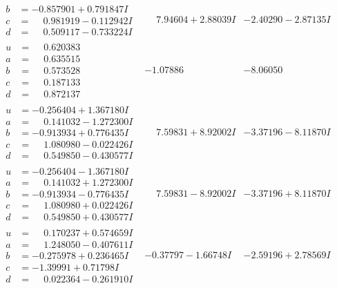 \documentclass[1p]{elsarticle_modified}
\theoremstyle{definition}
\begin{document}
$$\begin{array}{c|c|c}
\begin{aligned}
b &= -0.857901 + 0.791847 I \\
c &= \phantom{-}0.981919 - 0.112942 I \\
d &= \phantom{-}0.509117 - 0.733224 I\end{aligned}
 & \phantom{-}7.94604 + 2.88039 I & -2.40290 - 2.87135 I \\ \hline\begin{aligned}
u &= \phantom{-}0.620383\phantom{ +0.000000I} \\
a &= \phantom{-}0.635515\phantom{ +0.000000I} \\
b &= \phantom{-}0.573528\phantom{ +0.000000I} \\
c &= \phantom{-}0.187133\phantom{ +0.000000I} \\
d &= \phantom{-}0.872137\phantom{ +0.000000I}\end{aligned}
 & -1.07886\phantom{ +0.000000I} & -8.06050\phantom{ +0.000000I} \\ \hline\begin{aligned}
u &= -0.256404 + 1.367180 I \\
a &= \phantom{-}0.141032 - 1.272300 I \\
b &= -0.913934 + 0.776435 I \\
c &= \phantom{-}1.080980 - 0.022426 I \\
d &= \phantom{-}0.549850 - 0.430577 I\end{aligned}
 & \phantom{-}7.59831 + 8.92002 I & -3.37196 - 8.11870 I \\ \hline\begin{aligned}
u &= -0.256404 - 1.367180 I \\
a &= \phantom{-}0.141032 + 1.272300 I \\
b &= -0.913934 - 0.776435 I \\
c &= \phantom{-}1.080980 + 0.022426 I \\
d &= \phantom{-}0.549850 + 0.430577 I\end{aligned}
 & \phantom{-}7.59831 - 8.92002 I & -3.37196 + 8.11870 I \\ \hline\begin{aligned}
u &= \phantom{-}0.170237 + 0.574659 I \\
a &= \phantom{-}1.248050 - 0.407611 I \\
b &= -0.275978 + 0.236465 I \\
c &= -1.39991 + 0.71798 I \\
d &= \phantom{-}0.022364 - 0.261910 I\end{aligned}
 & -0.37797 - 1.66748 I & -2.59196 + 2.78569 I\\

\end{array}$$
\end{document}
